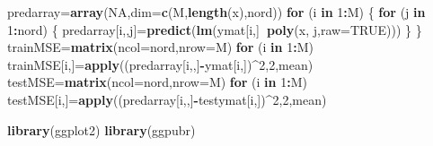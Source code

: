 \documentclass[]{article}
\newenvironment{Shaded}{\begin{snugshade}}{\end{snugshade}}
\newcommand{\KeywordTok}[1]{\textcolor[rgb]{0.13,0.29,0.53}{\textbf{#1}}}
\newcommand{\DataTypeTok}[1]{\textcolor[rgb]{0.13,0.29,0.53}{#1}}
\newcommand{\DecValTok}[1]{\textcolor[rgb]{0.00,0.00,0.81}{#1}}
\newcommand{\OtherTok}[1]{\textcolor[rgb]{0.56,0.35,0.01}{#1}}
\newcommand{\ControlFlowTok}[1]{\textcolor[rgb]{0.13,0.29,0.53}{\textbf{#1}}}
\newcommand{\OperatorTok}[1]{\textcolor[rgb]{0.81,0.36,0.00}{\textbf{#1}}}
\newcommand{\NormalTok}[1]{#1}
\begin{document}
\begin{Shaded}
\begin{Highlighting}[]
\NormalTok{predarray=}\KeywordTok{array}\NormalTok{(}\OtherTok{NA}\NormalTok{,}\DataTypeTok{dim=}\KeywordTok{c}\NormalTok{(M,}\KeywordTok{length}\NormalTok{(x),nord))}
\ControlFlowTok{for}\NormalTok{ (i }\ControlFlowTok{in} \DecValTok{1}\OperatorTok{:}\NormalTok{M)}
\NormalTok{\{}
  \ControlFlowTok{for}\NormalTok{ (j }\ControlFlowTok{in} \DecValTok{1}\OperatorTok{:}\NormalTok{nord)}
\NormalTok{  \{}
\NormalTok{    predarray[i,,j]=}\KeywordTok{predict}\NormalTok{(}\KeywordTok{lm}\NormalTok{(ymat[i,]}\OperatorTok{~}\KeywordTok{poly}\NormalTok{(x, j,}\DataTypeTok{raw=}\OtherTok{TRUE}\NormalTok{)))}
\NormalTok{  \}}
\NormalTok{\}  }
\NormalTok{trainMSE=}\KeywordTok{matrix}\NormalTok{(}\DataTypeTok{ncol=}\NormalTok{nord,}\DataTypeTok{nrow=}\NormalTok{M)}
\ControlFlowTok{for}\NormalTok{ (i }\ControlFlowTok{in} \DecValTok{1}\OperatorTok{:}\NormalTok{M) trainMSE[i,]=}\KeywordTok{apply}\NormalTok{((predarray[i,,]}\OperatorTok{-}\NormalTok{ymat[i,])}\OperatorTok{^}\DecValTok{2}\NormalTok{,}\DecValTok{2}\NormalTok{,mean)}
\NormalTok{testMSE=}\KeywordTok{matrix}\NormalTok{(}\DataTypeTok{ncol=}\NormalTok{nord,}\DataTypeTok{nrow=}\NormalTok{M)}
\ControlFlowTok{for}\NormalTok{ (i }\ControlFlowTok{in} \DecValTok{1}\OperatorTok{:}\NormalTok{M) testMSE[i,]=}\KeywordTok{apply}\NormalTok{((predarray[i,,]}\OperatorTok{-}\NormalTok{testymat[i,])}\OperatorTok{^}\DecValTok{2}\NormalTok{,}\DecValTok{2}\NormalTok{,mean)}

\KeywordTok{library}\NormalTok{(ggplot2)}
\KeywordTok{library}\NormalTok{(ggpubr)}


\end{Highlighting}
\end{Shaded}
\end{document}

